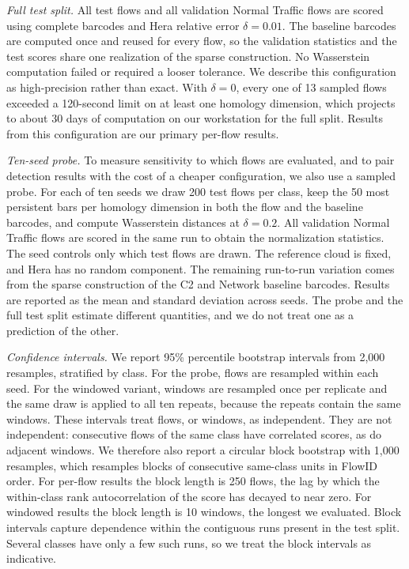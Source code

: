 \documentclass[conf]{new-aiaa}
\begin{document}
\textit{Full test split.} All \NTestFlows{} test flows and all \NValNormal{} validation Normal Traffic flows are scored using complete barcodes and Hera relative error $\delta = 0.01$. The baseline barcodes are computed once and reused for every flow, so the validation statistics and the test scores share one realization of the sparse construction. No Wasserstein computation failed or required a looser tolerance. We describe this configuration as high-precision rather than exact. With $\delta = 0$, every one of 13 sampled flows exceeded a 120-second limit on at least one homology dimension, which projects to about 30 days of computation on our workstation for the full split. Results from this configuration are our primary per-flow results.

\textit{Ten-seed probe.} To measure sensitivity to which flows are evaluated, and to pair detection results with the cost of a cheaper configuration, we also use a sampled probe. For each of ten seeds we draw 200 test flows per class, keep the 50 most persistent bars per homology dimension in both the flow and the baseline barcodes, and compute Wasserstein distances at $\delta = 0.2$. All validation Normal Traffic flows are scored in the same run to obtain the normalization statistics. The seed controls only which test flows are drawn. The reference cloud is fixed, and Hera has no random component. The remaining run-to-run variation comes from the sparse construction of the C2 and Network baseline barcodes. Results are reported as the mean and standard deviation across seeds. The probe and the full test split estimate different quantities, and we do not treat one as a prediction of the other.

\textit{Confidence intervals.} We report 95\% percentile bootstrap intervals \cite{EfronTibshirani} from 2,000 resamples, stratified by class. For the probe, flows are resampled within each seed. For the windowed variant, windows are resampled once per replicate and the same draw is applied to all ten repeats, because the repeats contain the same windows. These intervals treat flows, or windows, as independent. They are not independent: consecutive flows of the same class have correlated scores, as do adjacent windows. We therefore also report a circular block bootstrap \cite{PolitisRomano} with 1,000 resamples, which resamples blocks of consecutive same-class units in FlowID order. For per-flow results the block length is 250 flows, the lag by which the within-class rank autocorrelation of the score has decayed to near zero. For windowed results the block length is 10 windows, the longest we evaluated. Block intervals capture dependence within the contiguous runs present in the test split. Several classes have only a few such runs, so we treat the block intervals as indicative.
\end{document}
